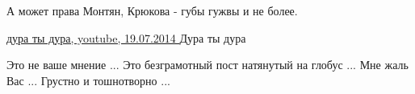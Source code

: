 \begin{itemize}
А может права Монтян, Крюкова - губы гужвы и не более.

 
\href{https://youtu.be/bw24yec61B4}{%
дура ты дура, youtube, 19.07.2014%
}
Дура ты дура

 

Это не ваше мнение ... Это безграмотный пост натянутый на глобус ... Мне жаль
Вас ... Грустно и тошнотворно ...

\end{itemize}


